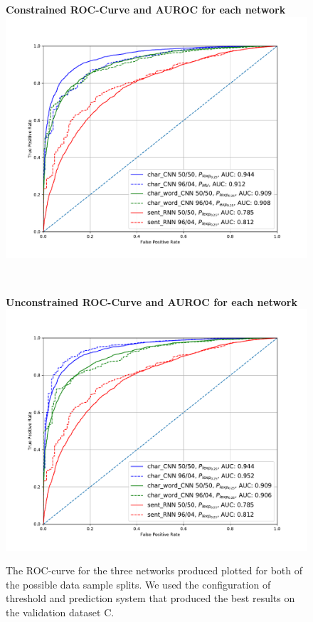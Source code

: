 \begin{figure}
    \centering
    \begin{minipage}{.8\textwidth}
        \centering
        \textbf{Constrained ROC-Curve and AUROC for each network}
        \includegraphics[width=1\linewidth]{./pictures/discussion/AUROC_Constrained}
    \end{minipage}\\
    \begin{minipage}{.8\textwidth}
        \centering
        \textbf{Unconstrained ROC-Curve and AUROC for each network}
        \includegraphics[width=1\linewidth]{./pictures/discussion/AUROC_Unconstrained}
    \end{minipage}
    \caption{The \gls{ROC}-curve for the three networks produced plotted for
        both of the possible data sample splits. We used the configuration of
        threshold and prediction system that produced the best results on the
        validation dataset \gls{C}.}
    \label{fig:AUROC}
\end{figure}

